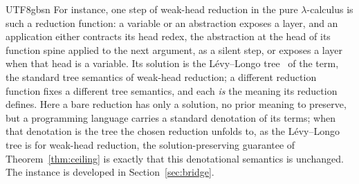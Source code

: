\begin{CJK*}{UTF8}{gbsn}
  For instance, one step of weak-head reduction in the pure $\lambda$-calculus is such a reduction function: a variable or an abstraction exposes a layer, and an application either contracts its head redex, the abstraction at the head of its function spine applied to the next argument, as a silent step, or exposes a layer when that head is a variable. Its solution is the L\'evy--Longo tree~\cite{longo1983-set-theoretical-models} of the term, the standard tree semantics of weak-head reduction; a different reduction function fixes a different tree semantics, and each \emph{is} the meaning its reduction defines. Here a bare reduction has only a solution, no prior meaning to preserve, but a programming language carries a standard denotation of its terms; when that denotation is the tree the chosen reduction unfolds to, as the L\'evy--Longo tree is for weak-head reduction, the solution-preserving guarantee of Theorem~\ref{thm:ceiling} is exactly that this denotational semantics is unchanged. The instance is developed in Section~\ref{sec:bridge}.


\end{CJK*}
